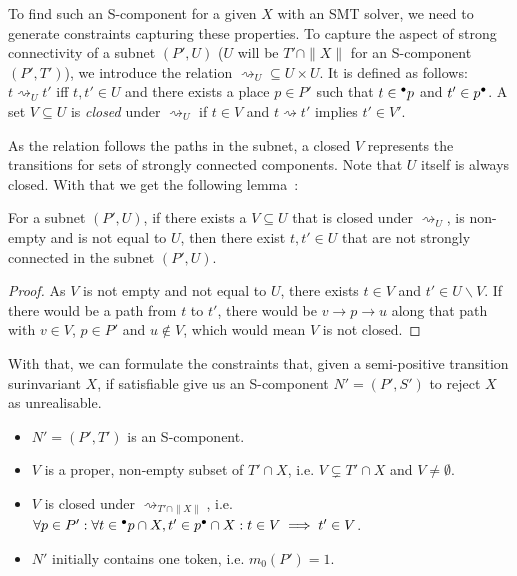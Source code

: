 To find such an S-component for a given $X$ with an SMT solver, we need
to generate constraints capturing these properties.
To capture the aspect of strong connectivity
of a subnet $(P', U)$ ($U$ will be $T' \cap \|X\|$ for an S-component $(P',T')$),
we introduce the relation $\rightsquigarrow_U \subseteq U \times U$.
It is defined as follows: $t \rightsquigarrow_U t'$ iff $t,t' \in U$ and
there exists a place $p \in P'$ such that $t \in \prescript{\bullet}{}{p}$ and $t' \in p^{\bullet}$.
A set $V \subseteq U$ is \emph{closed} under $\rightsquigarrow_U$ if
$t \in V$ and $t \rightsquigarrow t'$ implies $t' \in V'$.

As the relation follows the paths in the subnet,
a closed $V$ represents the transitions for sets of strongly connected components.
Note that $U$ itself is always closed.
With that we get the following lemma~\cite{EsparzaMelzer97}:
\begin{lemma}
\label{lem:closed-conn}
    For a subnet $(P',U)$,
    if there exists a $V \subseteq U$ that is closed under $\rightsquigarrow_U$,
    is non-empty and is not equal to $U$,
    then there exist $t,t' \in U$ that are not strongly connected in the subnet $(P',U)$.
\end{lemma}
\begin{proof}
    As $V$ is not empty and not equal to $U$, there exists $t \in V$ and $t' \in U \backslash V$.
    If there would be a path from $t$ to $t'$, there would be
    $v \rightarrow p \rightarrow u$ along that path with $v \in V$,
    $p \in P'$ and $u \notin V$, which would mean $V$ is not closed.
\end{proof}

With that, we can formulate the constraints that,
given a semi-positive transition surinvariant $X$,
if satisfiable
give us an S-component $N' = (P',S')$ to reject $X$ as unrealisable.

\vspace{-0.25cm}
\begin{itemize}
    \item $N' = (P',T')$ is an S-component.
    \item $V$ is a proper, non-empty subset of $T' \cap X$, i.e.
          $V \subsetneq T' \cap X$ and $V \ne \emptyset$.
    \item $V$ is closed under $\rightsquigarrow_{T' \cap \|X\|}$, i.e.
          $\forall p \in P': \forall t \in \prescript{\bullet}{}{p} \cap X, t' \in p^{\bullet} \cap X :
          t \in V \implies t' \in V$.
    \item $N'$ initially contains one token, i.e. $m_0(P') = 1$.
\end{itemize}
\vspace{-0.25cm}

